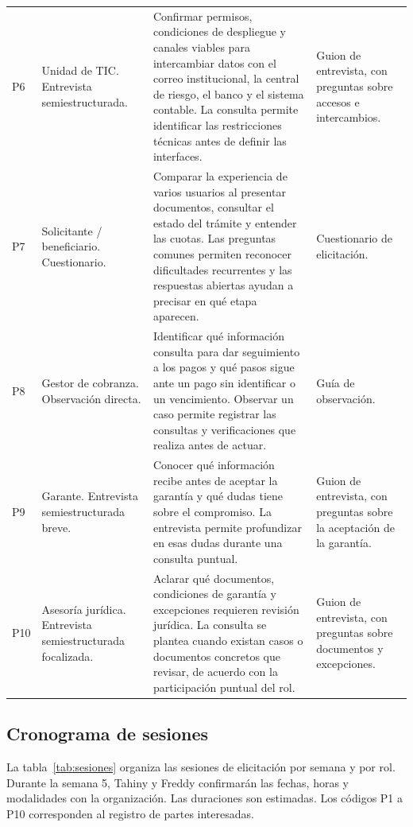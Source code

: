 \documentclass[11pt,a4paper]{article}
\begin{document}
\begin{longtable}{@{}L{.06}L{.24}L{.44}L{.19}@{}}
P6 & Unidad de TIC. Entrevista semiestructurada.
& Confirmar permisos, condiciones de despliegue y canales viables para
intercambiar datos con el correo institucional, la central de riesgo,
el banco y el sistema contable. La consulta permite identificar las
restricciones técnicas antes de definir las interfaces.
& Guion de entrevista, con preguntas sobre accesos e intercambios. \\
\addlinespace

P7 & Solicitante / beneficiario. Cuestionario.
& Comparar la experiencia de varios usuarios al presentar documentos,
consultar el estado del trámite y entender las cuotas. Las preguntas
comunes permiten reconocer dificultades recurrentes y las respuestas
abiertas ayudan a precisar en qué etapa aparecen.
& Cuestionario de elicitación. \\
\addlinespace

P8 & Gestor de cobranza. Observación directa.
& Identificar qué información consulta para dar seguimiento a los pagos
y qué pasos sigue ante un pago sin identificar o un vencimiento.
Observar un caso permite registrar las consultas y verificaciones
que realiza antes de actuar.
& Guía de observación. \\
\addlinespace

P9 & Garante. Entrevista semiestructurada breve.
& Conocer qué información recibe antes de aceptar la garantía y qué
dudas tiene sobre el compromiso. La entrevista permite profundizar
en esas dudas durante una consulta puntual.
& Guion de entrevista, con preguntas sobre la aceptación de la garantía. \\
\addlinespace

P10 & Asesoría jurídica. Entrevista semiestructurada focalizada.
& Aclarar qué documentos, condiciones de garantía y excepciones
requieren revisión jurídica. La consulta se plantea cuando existan
casos o documentos concretos que revisar, de acuerdo con la
participación puntual del rol.
& Guion de entrevista, con preguntas sobre documentos y excepciones. \\

\end{longtable}
\endgroup

\subsection{Cronograma de sesiones}

La tabla~\ref{tab:sesiones} organiza las sesiones de elicitación por
semana y por rol. Durante la semana 5, Tahiny y Freddy confirmarán
las fechas, horas y modalidades con la organización. Las duraciones
son estimadas. Los códigos P1 a P10 corresponden al registro de
partes interesadas.
\end{document}
